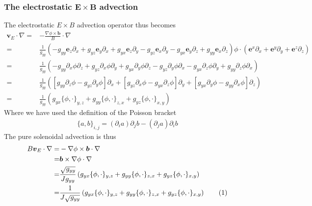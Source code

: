 \documentclass[12pt]{article}
\def\L{\left}
\def\R{\right}
\newcommand{\ve}[1]{\ensuremath{\boldsymbol{#1}}}
\newcommand\numberthis{\addtocounter{equation}{1}\tag{\theequation}}
\begin{document}
\subsubsection{The electrostatic \texorpdfstring{$\ve{E}\times \ve{B}$}{ExB}
           advection}
%
The electrostatic $E\times B$ advection operator thus becomes
%
\begin{align*}
    \ve{v}_E\cdot\nabla
    =& -\frac{\nabla\phi\times\ve{b}}{B}\cdot\nabla\\
    =&\frac{1}{g_{yy}}
           \L(
           - g_{yy}\ve{e}_z\partial_x
           + g_{yz}\ve{e}_y\partial_x
           + g_{yx}\ve{e}_z\partial_y
           - g_{yz}\ve{e}_x\partial_y
           - g_{yx}\ve{e}_y\partial_z
           + g_{yy}\ve{e}_x\partial_z
           \R)
           \phi
       \cdot\L(\ve{e}^x\partial_x + \ve{e}^y\partial_y + \ve{e}^z\partial_z\R)\\
    =& \frac{1}{g_{yy}}
           \L(
           - g_{yy}\partial_x\phi\partial_z
           + g_{yz}\partial_x\phi\partial_y
           + g_{yx}\partial_y\phi\partial_z
           - g_{yz}\partial_y\phi\partial_x
           - g_{yx}\partial_z\phi\partial_y
           + g_{yy}\partial_z\phi\partial_x
           \R)\\
    =& \frac{1}{g_{yy}}
           \L(
             \L[
               g_{yy}\partial_z\phi
             - g_{yz}\partial_y\phi
             \R]\partial_x
           +
             \L[
               g_{yz}\partial_x\phi
             - g_{yx}\partial_z\phi
             \R]\partial_y
           +
             \L[
               g_{yx}\partial_y\phi
             - g_{yy}\partial_x\phi
             \R]\partial_z
           \R)\\
    =& \frac{1}{g_{yy}}
               \L(
                 g_{yx}\{\phi, \cdot\}_{y,z}
                 +
                 g_{yy}\{\phi, \cdot\}_{z,x}
                 +
                 g_{yz}\{\phi, \cdot\}_{x,y}
               \R)
\end{align*}
%
Where we have used the definition of the Poisson bracket
%
\begin{align*}
    \{a, b\}_{i,j} =
      \L(\partial_i a\R) \partial_j b
    - \L(\partial_j a\R) \partial_i b
\end{align*}
%
The pure solenoidal advection is thus
%
\begin{align*}
    B\ve{v}_E\cdot\nabla
    =& -\nabla\phi\times\ve{b}\cdot\nabla\\
    =& \ve{b} \times \nabla\phi\cdot\nabla\\
    =& \frac{\sqrt{g_{yy}}}{Jg_{yy}}
               \L(
                 g_{yx}\{\phi, \cdot\}_{y,z}
                 +
                 g_{yy}\{\phi, \cdot\}_{z,x}
                 +
                 g_{yz}\{\phi, \cdot\}_{x,y}
               \R)
               \\
    =& \frac{1}{J\sqrt{g_{yy}}}
               \L(
                 g_{yx}\{\phi, \cdot\}_{y,z}
                 +
                 g_{yy}\{\phi, \cdot\}_{z,x}
                 +
                 g_{yz}\{\phi, \cdot\}_{x,y}
               \R)
           \numberthis
           \label{eq:brackets}
\end{align*}
\end{document}
